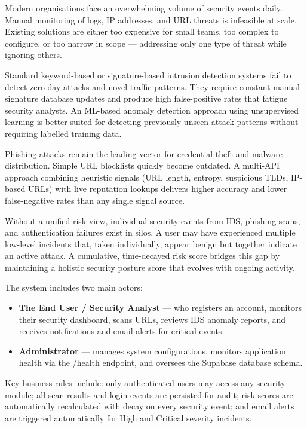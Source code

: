 Modern organisations face an overwhelming volume of security events daily. Manual monitoring of logs, IP addresses, and URL threats is infeasible at scale. Existing solutions are either too expensive for small teams, too complex to configure, or too narrow in scope --- addressing only one type of threat while ignoring others.

Standard keyword-based or signature-based intrusion detection systems fail to detect zero-day attacks and novel traffic patterns. They require constant manual signature database updates and produce high false-positive rates that fatigue security analysts. An ML-based anomaly detection approach using unsupervised learning is better suited for detecting previously unseen attack patterns without requiring labelled training data.

Phishing attacks remain the leading vector for credential theft and malware distribution. Simple URL blocklists quickly become outdated. A multi-API approach combining heuristic signals (URL length, entropy, suspicious TLDs, IP-based URLs) with live reputation lookups delivers higher accuracy and lower false-negative rates than any single signal source.

Without a unified risk view, individual security events from IDS, phishing scans, and authentication failures exist in silos. A user may have experienced multiple low-level incidents that, taken individually, appear benign but together indicate an active attack. A cumulative, time-decayed risk score bridges this gap by maintaining a holistic security posture score that evolves with ongoing activity.

The system includes two main actors:

\begin{itemize}
    \item \textbf{The End User / Security Analyst} --- who registers an account, monitors their security dashboard, scans URLs, reviews IDS anomaly reports, and receives notifications and email alerts for critical events.
    \item \textbf{Administrator} --- manages system configurations, monitors application health via the /health endpoint, and oversees the Supabase database schema.
\end{itemize}

Key business rules include: only authenticated users may access any security module; all scan results and login events are persisted for audit; risk scores are automatically recalculated with decay on every security event; and email alerts are triggered automatically for High and Critical severity incidents.
